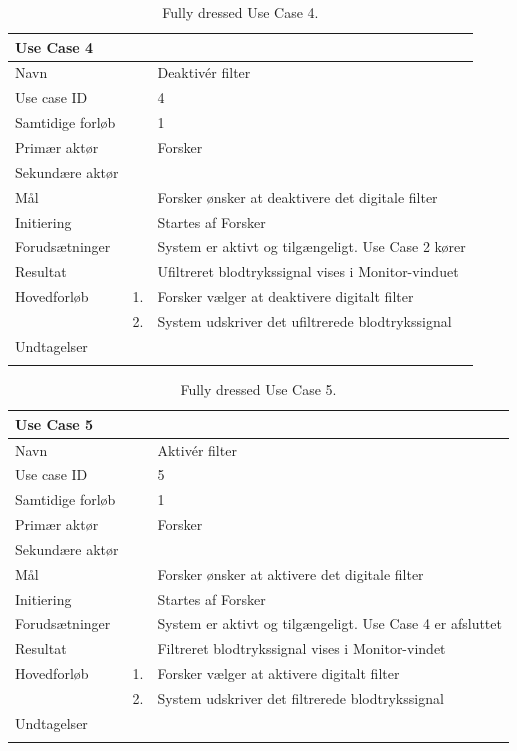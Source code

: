 \begin{longtabu} to  %
    {\large \textbf{Use Case 4}} && \\
    \toprule
    Navn &&    Deaktivér filter\\
    Use case ID &&    4\\
    Samtidige forløb &&   1\\
    Primær aktør &&    Forsker\\
    Sekundære aktør &&	 \\
    Mål &&    Forsker ønsker at deaktivere det digitale filter\\
    Initiering &&	Startes af Forsker\\
    Forudsætninger &&  System er aktivt og tilgængeligt. Use Case 2 kører  \\
    Resultat &&		Ufiltreret blodtrykssignal vises i Monitor-vinduet                 \\ \midrule
    Hovedforløb &    1. &    Forsker vælger at deaktivere digitalt filter \\[-1ex]   						 	
                &    2. &    System udskriver det ufiltrerede blodtrykssignal\newline\\ \midrule
                
    Undtagelser &     &      \\ \bottomrule
\caption{Fully dressed Use Case 4.}
\label{UC4}
\end{longtabu}


\begin{longtabu} to  %
    {\large \textbf{Use Case 5}} && \\
    \toprule
    Navn &&    Aktivér filter\\
    Use case ID &&    5\\
    Samtidige forløb &&   1\\
    Primær aktør &&    Forsker\\
    Sekundære aktør &&	 \\
    Mål &&    Forsker ønsker at aktivere det digitale filter\\
    Initiering &&	Startes af Forsker\\
    Forudsætninger &&  System er aktivt og tilgængeligt. Use Case 4 er afsluttet  \\
    Resultat &&		Filtreret blodtrykssignal vises i Monitor-vindet                 \\ \midrule
    Hovedforløb &    1. &    Forsker vælger at aktivere digitalt filter\\[-1ex]   						 	
                &    2. &    System udskriver det filtrerede blodtrykssignal\newline\\ \midrule
                
    Undtagelser &     &      \\ \bottomrule
\caption{Fully dressed Use Case 5.}
\label{UC5}
\end{longtabu}
    
